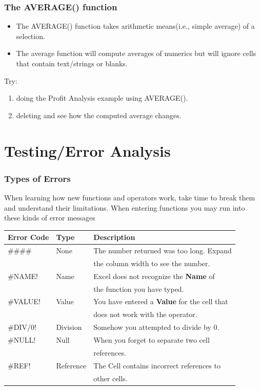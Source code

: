 \documentclass[12pt]{beamer}
\begin{document}
	\begin{frame}
		\frametitle{The AVERAGE() function}
		\begin{itemize}
			\item The AVERAGE() function takes arithmetic means(i.e., simple average) of a selection.
			\item The average function will compute averages of numerics but will ignore cells that contain text/strings or blanks.
		\end{itemize}
	\bigskip
	Try:
	\begin{enumerate} 
		\item doing the Profit Analysis example using AVERAGE(). 
		\item deleting and see how the computed average changes.  
	\end{enumerate}
	\end{frame}
\section{Testing/Error Analysis}
	\begin{frame}
		\frametitle{Types of Errors}
		When learning how new functions and operators work, take time to break them and understand their limitations. 
		When entering functions you may run into these kinds of error messages
		\begin{tabular}{ l | l | l }
			Error Code &  Type &Description \\
			\hline
			\#\#\#\#\ & None & The number returned was too long. Expand \\
			&& the column width to see the number. \\
			\#NAME! & Name & Excel does not recognize the \textbf{Name} of\\
			 && the function you have typed.\\
			\#VALUE! & Value & You have entered a \textbf{Value} for the cell that \\
			&& does not work with the operator. \\
			\#DIV/0! & Division & Somehow you attempted to divide by 0. \\
			\#NULL! & Null & When you forget to separate two cell\\
			&& references. \\
			\#REF! & Reference & The Cell contains incorrect references to\\
			&& other cells. \\
		\end{tabular}
	\end{frame}
	
\end{document}
